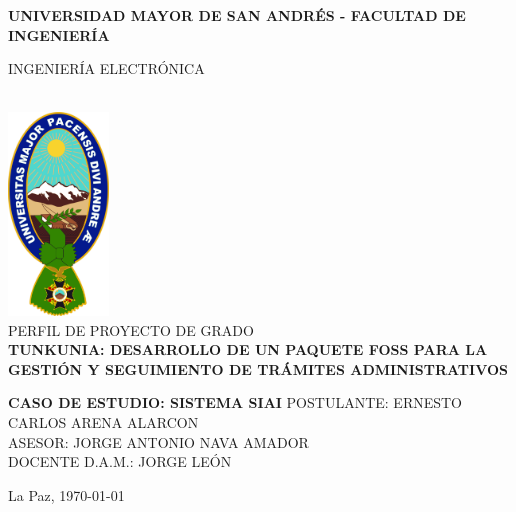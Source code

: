 \begin{titlepage}
	\centering
	{\bfseries \large UNIVERSIDAD MAYOR DE SAN ANDRÉS - FACULTAD DE INGENIERÍA\par INGENIERÍA ELECTRÓNICA }\\[2cm]

	\includegraphics[width=0.2\textwidth]{assets/umsa.png}
	\\[1cm]

	{\LARGE \MakeUppercase{Perfil de Proyecto de Grado}}\\[1cm]

	\textbf{\Large \MakeUppercase{TUNKUNIA: Desarrollo de un paquete FOSS para la gestión y seguimiento de trámites administrativos}}

	\textbf{\Large \MakeUppercase{Caso de Estudio: Sistema SIAI}}
	\vfill
	\MakeUppercase{Postulante: } \MakeUppercase{Ernesto Carlos Arena Alarcon}\\[1cm]

	\MakeUppercase{Asesor: } \MakeUppercase{Jorge Antonio Nava Amador}\\[1cm]

	\MakeUppercase{Docente D.A.M.: } \MakeUppercase{Jorge León}\\[1cm]

	\vfill
	{La Paz, \today\par}
\end{titlepage}